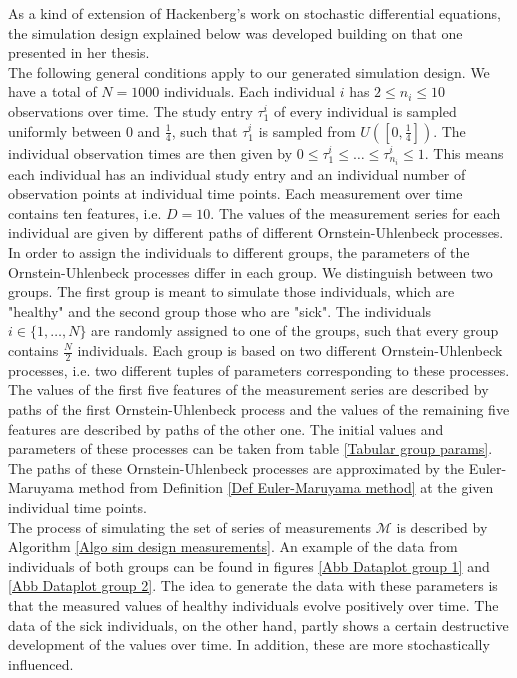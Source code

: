 \documentclass[11pt,titlepage]{article}
\theoremstyle{definition}
\theoremstyle{remark}
\begin{document}
	As a kind of extension of Hackenberg's work \cite{Hackenberg2022} on stochastic differential equations, the simulation design explained below was developed building on that one presented in her thesis.\\
	The following general conditions apply to our generated simulation design. We have a total of $N=1000$ individuals. Each individual $i$ has $2\leq n_i\leq 10$ observations over time.  The study entry $\tau^i_1$ of every individual is sampled uniformly between $0$ and $\frac{1}{4}$, such that $\tau^i_1$ is sampled from $U([0,\frac{1}{4}])$. The individual observation times are then given by $0\leq\tau^i_1\leq\ldots\leq \tau^i_{n_i}\leq 1$. This means each individual has an individual study entry and an individual number of observation points at individual time points. Each measurement over time contains ten features, i.e. $D=10$. The values of the measurement series for each individual are given by different paths of different Ornstein-Uhlenbeck processes. In order to assign the individuals to different groups, the parameters of the Ornstein-Uhlenbeck processes differ in each group. We distinguish between two groups. The first group is meant to simulate those individuals, which are "healthy" and the second group those who are "sick". The individuals $i\in\{1,\ldots,N\}$ are randomly assigned to one of the groups, such that every group contains $\frac{N}{2}$ individuals. Each group is based on two different Ornstein-Uhlenbeck processes, i.e. two different tuples of parameters corresponding to these processes. The values of the first five features of the measurement series are described by paths of the first Ornstein-Uhlenbeck process and the values of the remaining five features are described by paths of the other one. The initial values and parameters of these processes can be taken from table \ref{Tabular group params}. The paths of these Ornstein-Uhlenbeck processes are approximated by the Euler-Maruyama method from Definition \ref{Def Euler-Maruyama method} at the given individual time points.\\
	The process of simulating the set of series of measurements $\mathcal{M}$ is described by Algorithm \ref{Algo sim design measurements}. An example of the data from individuals of both groups can be found in figures \ref{Abb Dataplot group 1} and \ref{Abb Dataplot group 2}. The idea to generate the data with these parameters is that the measured values of healthy individuals evolve positively over time. The data of the sick individuals, on the other hand, partly shows a certain destructive development of the values over time. In addition, these are more stochastically influenced.
	
\end{document}
